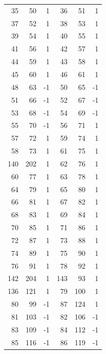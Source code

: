 \begin{longtable}{rrr@{\qquad}rrr}
35&50&1&36&51&1\\

37&52&1&38&53&1\\

39&54&1&40&55&1\\

41&56&1&42&57&1\\

44&59&1&43&58&1\\

45&60&1&46&61&1\\

48&63&-1&50&65&-1\\

51&66&-1&52&67&-1\\

53&68&-1&54&69&-1\\

55&70&-1&56&71&1\\

57&72&1&59&74&1\\

58&73&1&61&75&1\\

140&202&1&62&76&1\\

60&77&1&63&78&1\\

64&79&1&65&80&1\\

66&81&1&67&82&1\\

68&83&1&69&84&1\\

70&85&1&71&86&1\\

72&87&1&73&88&1\\

74&89&1&75&90&1\\

76&91&1&78&92&1\\

142&204&1&143&93&1\\

136&121&1&79&100&1\\

80&99&-1&87&124&1\\

81&103&-1&82&106&-1\\

83&109&-1&84&112&-1\\

85&116&-1&86&119&-1\\


\end{longtable}
